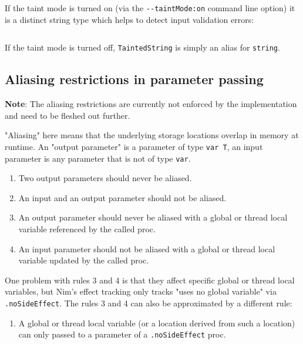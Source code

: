 If the taint mode is turned on (via the \texttt{-\/-taintMode:on}
command line option) it is a distinct string type which helps to detect
input validation errors:

\begin{verbatim}
\end{verbatim}

If the taint mode is turned off, \texttt{TaintedString} is simply an
alias for \texttt{string}.

\hypertarget{aliasing-restrictions-in-parameter-passing}{%
\subsection{Aliasing restrictions in parameter
passing}\label{aliasing-restrictions-in-parameter-passing}}

\textbf{Note}: The aliasing restrictions are currently not enforced by
the implementation and need to be fleshed out further.

"Aliasing" here means that the underlying storage locations overlap in
memory at runtime. An "output parameter" is a parameter of type
\texttt{var\ T}, an input parameter is any parameter that is not of type
\texttt{var}.

\begin{enumerate}
\def\labelenumi{\arabic{enumi}.}
\tightlist
\item
  Two output parameters should never be aliased.
\item
  An input and an output parameter should not be aliased.
\item
  An output parameter should never be aliased with a global or thread
  local variable referenced by the called proc.
\item
  An input parameter should not be aliased with a global or thread local
  variable updated by the called proc.
\end{enumerate}

One problem with rules 3 and 4 is that they affect specific global or
thread local variables, but Nim's effect tracking only tracks "uses no
global variable" via \texttt{.noSideEffect}. The rules 3 and 4 can also
be approximated by a different rule:

\begin{enumerate}
\def\labelenumi{\arabic{enumi}.}
\setcounter{enumi}{4}
\tightlist
\item
  A global or thread local variable (or a location derived from such a
  location) can only passed to a parameter of a \texttt{.noSideEffect}
  proc.
\end{enumerate}

